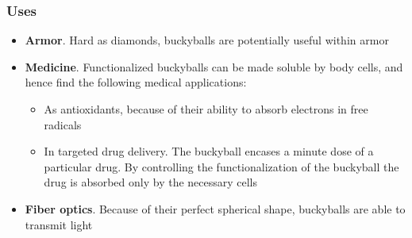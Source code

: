 \documentclass{beamer}
\begin{document}
\begin{frame}
	\frametitle{Uses}
	\begin{itemize}
		\item<1-> \textbf{Armor}. Hard as diamonds, buckyballs are potentially useful within armor
		
		\item<2-> \textbf{Medicine}. Functionalized buckyballs can be made soluble by body cells, and hence find the following medical applications:
			\begin{itemize}
				\item<2-> As antioxidants, because of their ability to absorb electrons in free radicals
				
				\item<2-> In targeted drug delivery. The buckyball encases a minute dose of a particular drug. By controlling the functionalization of the buckyball the drug is absorbed only by the necessary cells
			\end{itemize}
		\item<3-> \textbf{Fiber optics}. Because of their perfect spherical shape, buckyballs are able to transmit light
	\end{itemize}
\end{frame}
\end{document}
